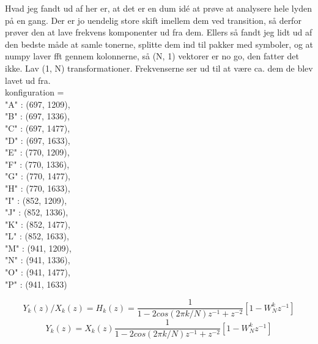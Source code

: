 \begin{Opgaver}
\begin{kapitel}
\begin{Opgave}
\begin{UnderOpgave}
            
            \end{UnderOpgave}
            \begin{UnderOpgave}
            Hvad jeg fandt ud af her er, at det er en dum idé at prøve at analysere hele lyden på en gang. Der er jo uendelig store skift imellem dem ved transition, så derfor prøver den at lave frekvens komponenter ud fra dem. 
            Ellers så fandt jeg lidt ud af den bedste måde at samle tonerne, splitte dem ind til pakker med symboler, og at 
            numpy laver fft gennem kolonnerne, så (N, 1) vektorer er no go, den fatter det ikke. Lav (1, N) transformationer. Frekvenserne ser ud til at være ca. dem de blev lavet ud fra. \\
            konfiguration = {\\
                "A" : (697, 1209), \\
                "B" : (697, 1336), \\
                "C" : (697, 1477), \\
                "D" : (697, 1633), \\
                "E" : (770, 1209), \\
                "F" : (770, 1336), \\
                "G" : (770, 1477), \\
                "H" : (770, 1633), \\
                "I" : (852, 1209), \\
                "J" : (852, 1336), \\
                "K" : (852, 1477), \\
                "L" : (852, 1633), \\
                "M" : (941, 1209), \\
                "N" : (941, 1336), \\
                "O" : (941, 1477), \\
                "P" : (941, 1633)  \\    
            }
            \end{UnderOpgave}
            

            \begin{UnderOpgave}
                \[Y_k(z)/X_k(z) = H_k(z) = \frac{1}{1 - 2cos(2\pi k / N)z^{-1} + z^{-2}}[1 - W_N^k z^{-1}]\]
                \[Y_k(z) = X_k(z) \frac{1}{1 - 2cos(2\pi k / N)z^{-1} + z^{-2}}[1 - W_N^k z^{-1}]\]



\end{UnderOpgave}
\end{Opgave}
\end{kapitel}
\end{Opgaver}
